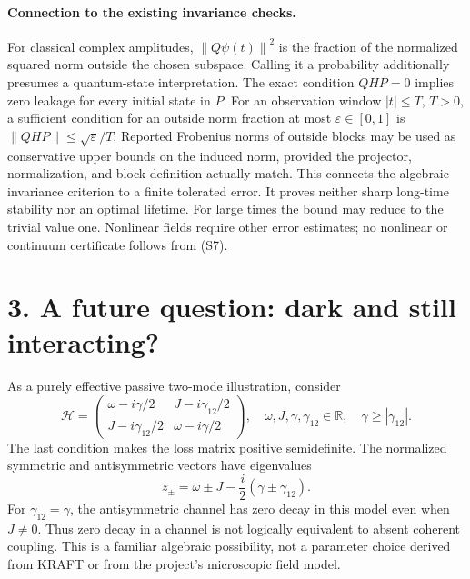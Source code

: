 \documentclass[a4paper,11pt]{article}
\newcommand{\norm}[1]{\left\lVert #1\right\rVert}
\begin{document}
\paragraph{Connection to the existing invariance checks.}
For classical complex amplitudes, \(\norm{Q\psi(t)}^2\) is the fraction of
the normalized squared norm outside the chosen subspace. Calling it a
probability additionally presumes a quantum-state interpretation.
The exact condition \(QHP=0\) implies zero leakage for every initial state
in \(P\). For an observation window \(|t|\leq T\), \(T>0\), a sufficient
condition for an outside norm fraction at most \(\varepsilon\in[0,1]\) is
\(\norm{QHP}\leq\sqrt{\varepsilon}/T\).
Reported Frobenius norms of outside blocks may be used as conservative
upper bounds on the induced norm, provided the projector, normalization,
and block definition actually match.
This connects the algebraic invariance criterion to a finite tolerated
error. It proves neither sharp long-time stability nor an optimal
lifetime. For large times the bound may reduce to the trivial value one.
Nonlinear fields require other error estimates; no nonlinear or
continuum certificate follows from (S7).

\section*{3. A future question: dark and still interacting?}
As a purely effective passive two-mode illustration, consider
\begin{equation}
\mathcal H=
\begin{pmatrix}
\omega-i\gamma/2 & J-i\gamma_{12}/2\\
J-i\gamma_{12}/2 & \omega-i\gamma/2
\end{pmatrix},
\quad
\omega,J,\gamma,\gamma_{12}\in\mathbb R,\quad
\gamma\geq|\gamma_{12}|.
\tag{S8}
\end{equation}
The last condition makes the loss matrix positive semidefinite.
The normalized symmetric and antisymmetric vectors have eigenvalues
\begin{equation}
z_\pm=\omega\pm J-\frac{i}{2}(\gamma\pm\gamma_{12}).
\tag{S9}
\end{equation}
For \(\gamma_{12}=\gamma\), the antisymmetric channel has zero decay
in this model even when \(J\ne0\). Thus zero decay in a channel is not
logically equivalent to absent coherent coupling. This is a familiar
algebraic possibility, not a parameter choice derived from KRAFT or
from the project's microscopic field model.
\end{document}
